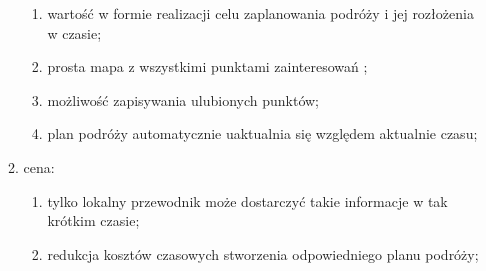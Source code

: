 \begin{enumerate}[label=\Roman*.]
\begin{enumerate}[label=\alph*.]
        \begin{enumerate}[label=\roman*.]
            \item wartość w formie realizacji celu zaplanowania podróży i jej rozłożenia w czasie;
            \item prosta mapa z wszystkimi punktami zainteresowań ;
            \item możliwość zapisywania ulubionych punktów;
            \item plan podróży automatycznie uaktualnia się względem aktualnie  czasu;
        \end{enumerate}
        \item cena:
        \begin{enumerate}[label=\roman*.]
            \item tylko lokalny przewodnik może dostarczyć takie informacje w tak krótkim czasie;
            \item redukcja kosztów czasowych stworzenia odpowiedniego planu podróży;
        \end{enumerate}

    \end{enumerate}
\end{enumerate}
